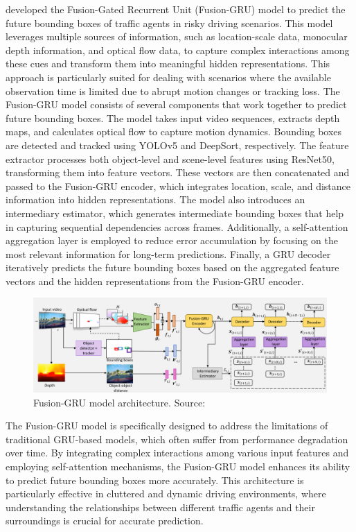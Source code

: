 \documentclass[12pt,oneside]{book} %
\begin{document}
\citet{FusionGRU} developed the Fusion-Gated Recurrent
Unit (Fusion-GRU) model to predict the future bounding boxes of traffic agents
in risky driving scenarios. This model leverages multiple sources of
information, such as location-scale data, monocular depth information, and
optical flow data, to capture complex interactions among these cues and
transform them into meaningful hidden representations. This approach is
particularly suited for dealing with scenarios where the available observation
time is limited due to abrupt motion changes or tracking loss. 
The Fusion-GRU model consists of several components that work together to
predict future bounding boxes. The model takes input video sequences, extracts
depth maps, and calculates optical flow to capture motion dynamics. Bounding
boxes are detected and tracked using YOLOv5 and DeepSort, respectively. The
feature extractor processes both object-level and scene-level features using
ResNet50, transforming them into feature vectors. These vectors are then
concatenated and passed to the Fusion-GRU encoder, which integrates location,
scale, and distance information into hidden representations. 
The model also introduces an intermediary estimator, which generates
intermediate bounding boxes that help in capturing sequential dependencies
across frames. Additionally, a self-attention aggregation layer is employed to
reduce error accumulation by focusing on the most relevant information for
long-term predictions. Finally, a GRU decoder iteratively predicts the future
bounding boxes based on the aggregated feature vectors and the hidden
representations from the Fusion-GRU encoder.

\begin{figure}[H]
    \centering
    \includegraphics[width=1\textwidth]{figures/FusionGRU.png}
    \caption{Fusion-GRU model architecture. Source:~\citet{FusionGRU}}\label{fig:fusion-gru}
\end{figure}

The Fusion-GRU model is specifically designed to address the limitations of
traditional GRU-based models, which often suffer from performance degradation
over time. By integrating complex interactions among various input features and
employing self-attention mechanisms, the Fusion-GRU model enhances its ability
to predict future bounding boxes more accurately. This architecture is
particularly effective in cluttered and dynamic driving environments, where
understanding the relationships between different traffic agents and their
surroundings is crucial for accurate prediction.
\end{document}
